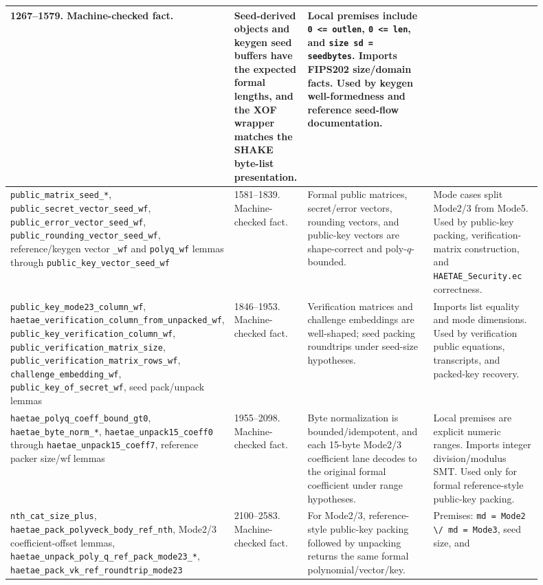 \documentclass[11pt]{report}
\DeclareRobustCommand{\file}[1]{\ifmmode\text{\nolinkurl{#1}}\else\nolinkurl{#1}\fi}
\DeclareRobustCommand{\ec}[1]{\ifmmode\text{\nolinkurl{#1}}\else\nolinkurl{#1}\fi}
\theoremstyle{definition}
\theoremstyle{plain}
\begin{document}
{\begin{longtable}{p{0.25\linewidth}p{0.14\linewidth}p{0.28\linewidth}p{0.23\linewidth}}
1267--1579. Machine-checked fact. &
Seed-derived objects and keygen seed buffers have the expected formal lengths,
and the XOF wrapper matches the SHAKE byte-list presentation. &
Local premises include \ec{0 <= outlen}, \ec{0 <= len}, and
\ec{size sd = seedbytes}.  Imports FIPS202 size/domain facts.  Used by keygen
well-formedness and reference seed-flow documentation. \\
\midrule
\ec{public\_matrix\_seed\_*}, \ec{public\_secret\_vector\_seed\_wf},
\ec{public\_error\_vector\_seed\_wf}, \ec{public\_rounding\_vector\_seed\_wf},
reference/keygen vector \ec{\_wf} and \ec{polyq\_wf} lemmas through
\ec{public\_key\_vector\_seed\_wf} &
1581--1839. Machine-checked fact. &
Formal public matrices, secret/error vectors, rounding vectors, and public-key
vectors are shape-correct and poly-\(q\)-bounded. &
Mode cases split Mode2/3 from Mode5.  Used by public-key packing,
verification-matrix construction, and \file{HAETAE\_Security.ec} correctness. \\
\midrule
\ec{public\_key\_mode23\_column\_wf},
\ec{haetae\_verification\_column\_from\_unpacked\_wf},
\ec{public\_key\_verification\_column\_wf},
\ec{public\_verification\_matrix\_size},
\ec{public\_verification\_matrix\_rows\_wf},
\ec{challenge\_embedding\_wf}, \ec{public\_key\_of\_secret\_wf},
seed pack/unpack lemmas &
1846--1953. Machine-checked fact. &
Verification matrices and challenge embeddings are well-shaped; seed packing
roundtrips under seed-size hypotheses. &
Imports list equality and mode dimensions.  Used by verification public
equations, transcripts, and packed-key recovery. \\
\midrule
\ec{haetae\_polyq\_coeff\_bound\_gt0},
\ec{haetae\_byte\_norm\_*}, \ec{haetae\_unpack15\_coeff0} through
\ec{haetae\_unpack15\_coeff7}, reference packer size/wf lemmas &
1955--2098. Machine-checked fact. &
Byte normalization is bounded/idempotent, and each 15-byte Mode2/3 coefficient
lane decodes to the original formal coefficient under range hypotheses. &
Local premises are explicit numeric ranges.  Imports integer division/modulus
SMT.  Used only for formal reference-style public-key packing. \\
\midrule
\ec{nth\_cat\_size\_plus}, \ec{haetae\_pack\_polyveck\_body\_ref\_nth},
Mode2/3 coefficient-offset lemmas, \ec{haetae\_unpack\_poly\_q\_ref\_pack\_mode23\_*},
\ec{haetae\_pack\_vk\_ref\_roundtrip\_mode23} &
2100--2583. Machine-checked fact. &
For Mode2/3, reference-style public-key packing followed by unpacking returns
the same formal polynomial/vector/key. &
Premises: \ec{md = Mode2 \/ md = Mode3}, seed size, and

\end{longtable}}
\end{document}
